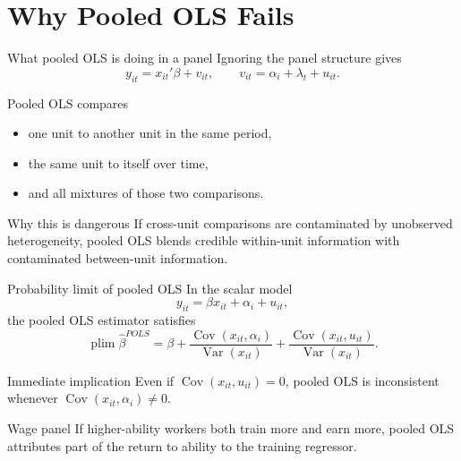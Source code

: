 \documentclass[10pt]{beamer}
\DeclareMathOperator{\Cov}{Cov}
\DeclareMathOperator{\Var}{Var}
\newcommand{\plim}{\operatorname*{plim}}
\begin{document}
\section{Why Pooled OLS Fails}

\begin{frame}{What pooled OLS is doing in a panel}
\label{slide:pooledintuition}
\small
Ignoring the panel structure gives
\[
y_{it} = x_{it}'\beta + v_{it},
\qquad
v_{it} = \alpha_i + \lambda_t + u_{it}.
\]

\begin{block}{Pooled OLS compares}
\begin{itemize}
  \item one unit to another unit in the same period,
  \item the same unit to itself over time,
  \item and all mixtures of those two comparisons.
\end{itemize}
\end{block}

\pause
\begin{alertblock}{Why this is dangerous}
If cross-unit comparisons are contaminated by unobserved heterogeneity, pooled OLS blends credible within-unit information with contaminated between-unit information.
\end{alertblock}
\end{frame}

\begin{frame}{Probability limit of pooled OLS}
\label{slide:poolsbias}
\small
In the scalar model
\[
y_{it} = \beta x_{it} + \alpha_i + u_{it},
\]
the pooled OLS estimator satisfies
\[
\plim \hat{\beta}^{POLS}
=
\beta
+ \frac{\Cov(x_{it}, \alpha_i)}{\Var(x_{it})}
+ \frac{\Cov(x_{it}, u_{it})}{\Var(x_{it})}.
\]

\begin{block}{Immediate implication}
Even if $\Cov(x_{it},u_{it})=0$, pooled OLS is inconsistent whenever $\Cov(x_{it},\alpha_i)\neq 0$.
\end{block}

\pause
\begin{exampleblock}{Wage panel}
If higher-ability workers both train more and earn more, pooled OLS attributes part of the return to ability to the training regressor.
\end{exampleblock}

\hfill\hyperlink{app:poolsproof}{}
\end{frame}
\end{document}
